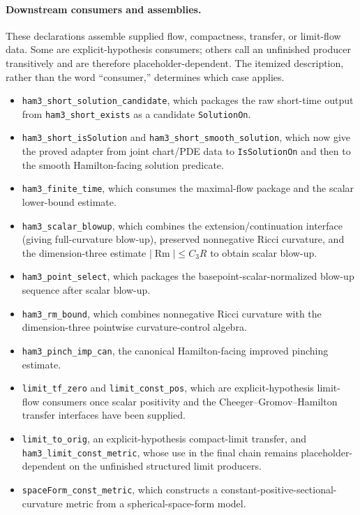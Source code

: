 \documentclass[11pt]{article}
\theoremstyle{plain}
\theoremstyle{definition}
\theoremstyle{remark}
\newcommand{\Rm}{\operatorname{Rm}}
\newcommand{\norm}[1]{\left|#1\right|}
\newcommand{\leanref}[1]{\nolinkurl{#1}}
\begin{document}
\paragraph{Downstream consumers and assemblies.}
These declarations assemble supplied flow, compactness, transfer, or
limit-flow data.  Some are explicit-hypothesis consumers; others call an
unfinished producer transitively and are therefore placeholder-dependent.
The itemized description, rather than the word ``consumer,'' determines which
case applies.
\begin{itemize}[leftmargin=2em]
  \item \leanref{ham3_short_solution_candidate}, which packages the raw
  short-time output from \leanref{ham3_short_exists} as a candidate
  \leanref{SolutionOn}.
  \item \leanref{ham3_short_isSolution} and
  \leanref{ham3_short_smooth_solution}, which now give the proved adapter from
  joint chart/PDE data to \leanref{IsSolutionOn} and then to the smooth
  Hamilton-facing solution predicate.
  \item \leanref{ham3_finite_time}, which consumes the maximal-flow package and
  the scalar lower-bound estimate.
  \item \leanref{ham3_scalar_blowup}, which combines the
  extension/continuation interface (giving full-curvature blow-up), preserved
  nonnegative Ricci curvature, and the dimension-three estimate
  \(\norm{\Rm}\le C_3R\) to obtain scalar blow-up.
  \item \leanref{ham3_point_select}, which packages the basepoint-scalar-normalized blow-up
  sequence after scalar blow-up.
  \item \leanref{ham3_rm_bound}, which combines nonnegative Ricci curvature
  with the dimension-three pointwise curvature-control algebra.
  \item \leanref{ham3_pinch_imp_can}, the canonical Hamilton-facing improved
  pinching estimate.
  \item \leanref{limit_tf_zero} and \leanref{limit_const_pos}, which are
  explicit-hypothesis limit-flow consumers once scalar positivity and
  the Cheeger--Gromov--Hamilton transfer interfaces have been supplied.
  \item \leanref{limit_to_orig}, an explicit-hypothesis
  compact-limit transfer, and \leanref{ham3_limit_const_metric}, whose use in
  the final chain remains placeholder-dependent on the unfinished structured
  limit producers.
  \item \leanref{spaceForm_const_metric}, which constructs a
  constant-positive-sectional-curvature metric from a spherical-space-form
  model.
\end{itemize}
\end{document}
